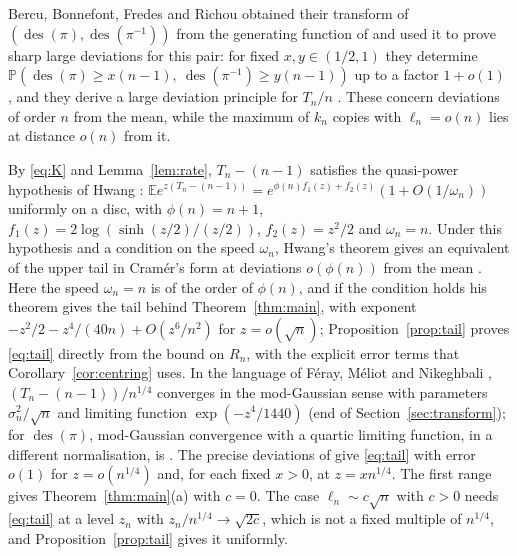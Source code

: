 \documentclass[11pt]{amsart}
\theoremstyle{remark}
\newcommand{\des}{\operatorname{des}}
\newcommand{\E}{\mathbb{E}}
\renewcommand{\P}{\mathbb{P}}
\begin{document}
Bercu, Bonnefont, Fredes and Richou obtained their transform of $(\des(\pi),\des(\pi^{-1}))$ from the generating function of \cite{CRS66} and used it to prove sharp large deviations for this pair: for fixed $x,y\in(1/2,1)$ they determine $\P(\des(\pi)\ge x(n-1),\ \des(\pi^{-1})\ge y(n-1))$ up to a factor $1+o(1)$ \cite[Theorem~4.2]{BBFR24}, and they derive a large deviation principle for $T_n/n$ \cite[Corollary~4.2]{BBFR24}. These concern deviations of order $n$ from the mean, while the maximum of $k_n$ copies with $\ell_n=o(n)$ lies at distance $o(n)$ from it.

By \eqref{eq:K} and Lemma~\ref{lem:rate}, $T_n-(n-1)$ satisfies the quasi-power hypothesis of Hwang \cite{Hwa96}: $\E e^{z(T_n-(n-1))}=e^{\phi(n)f_1(z)+f_2(z)}(1+O(1/\omega_n))$ uniformly on a disc, with $\phi(n)=n+1$, $f_1(z)=2\log(\sinh(z/2)/(z/2))$, $f_2(z)=z^2/2$ and $\omega_n=n$. Under this hypothesis and a condition on the speed $\omega_n$, Hwang's theorem \cite[Theorem~1]{Hwa96} gives an equivalent of the upper tail in Cram\'er's form at deviations $o(\phi(n))$ from the mean \cite[Remark~1.2]{FMN16}. Here the speed $\omega_n=n$ is of the order of $\phi(n)$, and if the condition holds his theorem gives the tail behind Theorem~\ref{thm:main}, with exponent $-z^2/2-z^4/(40n)+O(z^6/n^2)$ for $z=o(\sqrt n)$; Proposition~\ref{prop:tail} proves \eqref{eq:tail} directly from the bound on $R_n$, with the explicit error terms that Corollary~\ref{cor:centring} uses. In the language of F\'eray, M\'eliot and Nikeghbali \cite{FMN16}, $(T_n-(n-1))/n^{1/4}$ converges in the mod-Gaussian sense with parameters $\sigma_n^2/\sqrt n$ and limiting function $\exp(-z^4/1440)$ (end of Section~\ref{sec:transform}); for $\des(\pi)$, mod-Gaussian convergence with a quartic limiting function, in a different normalisation, is \cite[Proposition~4.1]{HST24}. The precise deviations of \cite[Theorems~4.3 and~4.8]{FMN16} give \eqref{eq:tail} with error $o(1)$ for $z=o(n^{1/4})$ and, for each fixed $x>0$, at $z=xn^{1/4}$. The first range gives Theorem~\ref{thm:main}(a) with $c=0$. The case $\ell_n\sim c\sqrt n$ with $c>0$ needs \eqref{eq:tail} at a level $z_n$ with $z_n/n^{1/4}\to\sqrt{2c}$, which is not a fixed multiple of $n^{1/4}$, and Proposition~\ref{prop:tail} gives it uniformly.
\end{document}
